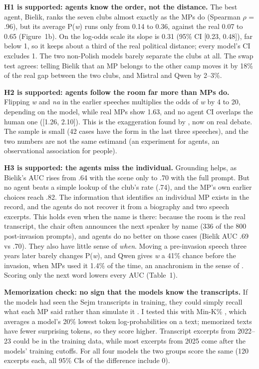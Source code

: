 \documentclass[10pt,twocolumn]{article}
\begin{document}
\textbf{H1 is supported: agents know the order, not the distance.} The best agent, Bielik, ranks the seven clubs almost exactly as the MPs do (Spearman $\rho$ = .96), but its average P(\emph{w}) runs only from 0.14 to 0.36, against the real 0.07 to 0.65 (Figure~1b). On the log-odds scale its slope is 0.31 (95\% CI [0.23, 0.48]), far below 1, so it keeps about a third of the real political distance; every model's CI excludes 1. The two non-Polish models barely separate the clubs at all. The swap test agrees: telling Bielik that an MP belongs to the other camp moves it by 18\% of the real gap between the two clubs, and Mistral and Qwen by 2--3\%.

\textbf{H2 is supported: agents follow the room far more than MPs do.} Flipping \emph{w} and \emph{na} in the earlier speeches multiplies the odds of \emph{w} by 4 to 20, depending on the model, while real MPs show 1.63, and no agent CI overlaps the human one ([1.26, 2.10]). This is the exaggeration found by \citet{ashokkumar2026}, now on real debate. The sample is small (42 cases have the form in the last three speeches), and the two numbers are not the same estimand (an experiment for agents, an observational association for people).

\textbf{H3 is supported: the agents miss the individual.} Grounding helps, as Bielik's AUC rises from .64 with the scene only to .70 with the full prompt. But no agent beats a simple lookup of the club's rate (.74), and the MP's own earlier choices reach .82. The information that identifies an individual MP exists in the record, and the agents do not recover it from a biography and two speech excerpts. This holds even when the name is there: because the room is the real transcript, the chair often announces the next speaker by name (336 of the 800 post-invasion prompts), and agents do no better on those cases (Bielik AUC .69 vs .70). They also have little sense of \emph{when}. Moving a pre-invasion speech three years later barely changes P(\emph{w}), and Qwen gives \emph{w} a 41\% chance before the invasion, when MPs used it 1.4\% of the time, an anachronism in the sense of \citet{underwood2026}. Scoring only the next word lowers every AUC (Table~1).

\textbf{Memorization check: no sign that the models know the transcripts.} If the models had seen the Sejm transcripts in training, they could simply recall what each MP said rather than simulate it \citep{chang2023}. I tested this with Min-K\% \citep{shi2024}, which averages a model's 20\% lowest token log-probabilities on a text; memorized texts have fewer surprising tokens, so they score higher. Transcript excerpts from 2022--23 could be in the training data, while most excerpts from 2025 come after the models' training cutoffs. For all four models the two groups score the same (120 excerpts each, all 95\% CIs of the difference include 0).
\end{document}
